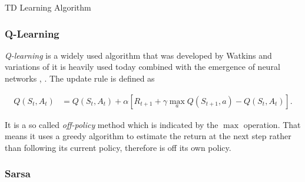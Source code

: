 \documentclass[result.tex]{subfiles}
\begin{document}
    \begin{algorithm}[H]
        \begin{algorithmic}[1]
            \Statex


            \EndWhile
            \EndFor
            \State
            \EndFunction
        \end{algorithmic}
        \caption{TD Learning Algorithm}
        \label{alg:td_learning}
    \end{algorithm}

    \subsubsection*{Q-Learning}

    \textit{Q-learning} is a widely used algorithm that was developed by Watkins \cite{watkins1989learning} and variations of it is heavily used today combined with the emergence of neural networks \cite{lange2010deep}, \cite{van2016deep}. The update rule is defined as

    \begin{align*}
        Q(S_t, A_t) &=
        Q(S_t , A_t) +
        \alpha \left[
        R_{t + 1} +
        \gamma \max_a Q(S_{t + 1}, a) - Q(S_t, A_t)
        \right].
    \end{align*}

    It is a so called \textit{off-policy} method which is indicated by the $\max$ operation. That means it uses a greedy algorithm to estimate the return at the next step rather than following its current policy, therefore is off its own policy.

    \subsubsection*{Sarsa}
\end{document}
